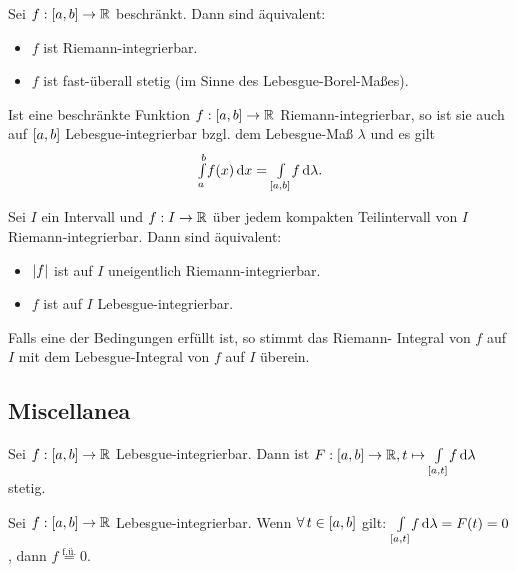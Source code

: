\documentclass{cheat-sheet}
\newcommand{\fue}{\overset{\text{f.ü.}}} %
\theoremstyle{definition}
\begin{document}
\begin{satz}
  Sei $f : \left[ a, b \right] \to \mathbb{R}$ beschränkt. Dann sind äquivalent:
  \begin{itemize}
    \item $f$ ist Riemann-integrierbar.
    \item $f$ ist fast-überall stetig (im Sinne des Lebesgue-Borel-Maßes).
  \end{itemize}
\end{satz}

\begin{satz}
  Ist eine beschränkte Funktion $f : \left[ a, b \right] \to \mathbb{R}$ Riemann-integrierbar, so ist sie auch auf $\left[ a, b \right]$ Lebesgue-integrierbar bzgl. dem Lebesgue-Maß $\lambda$ und es gilt
  \[ {\textstyle \int\limits_{a}^{b}} f(x) \,\mathrm{d} x = {\textstyle \int\limits_{\left[ a, b \right]}^{}} f \,\mathrm{d} \lambda. \]
\end{satz}

\begin{samepage}
\begin{satz}
  Sei $I$ ein Intervall und $f : I \to \mathbb{R}$ über jedem kompakten Teilintervall von $I$ Riemann-integrierbar. Dann sind äquivalent:
  \begin{itemize}
    \item $\lvert f\rvert$ ist auf $I$ uneigentlich Riemann-integrierbar.
    \item $f$ ist auf $I$ Lebesgue-integrierbar.
  \end{itemize}
  Falls eine der Bedingungen erfüllt ist, so stimmt das Riemann- Integral von $f$ auf $I$ mit dem Lebesgue-Integral von $f$ auf $I$ überein.
\end{satz}

\subsection{Miscellanea}
\end{samepage}

\begin{satz}
  Sei $f : \left[ a, b \right] \to \mathbb{R}$ Lebesgue-integrierbar. Dann ist $F : \left[ a, b \right] \to \mathbb{R}, t \mapsto {\textstyle \int\limits_{\left[ a, t \right]}^{}} f \,\mathrm{d} \lambda$ stetig.
\end{satz}

\begin{satz}
  Sei $f : \left[ a, b \right] \to \mathbb{R}$ Lebesgue-integrierbar. Wenn $\forall \, t \in \left[ a, b \right]$ gilt: ${\textstyle \int\limits_{\left[ a, t \right]}^{}} f \,\mathrm{d} \lambda = F(t) = 0$, dann $f \fue= 0$.
\end{satz}
\end{document}
